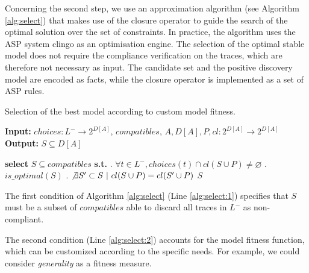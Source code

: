 Concerning the second step, we use an approximation algorithm (see Algorithm \ref{alg:select}) that makes use of the closure operator to guide the search of the optimal solution over the set of constraints. 
%
In practice, the algorithm uses the \ac{ASP} \cite{2008-Lifschitz} system clingo as an optimisation engine. The selection of the optimal stable model does not require the compliance verification on the traces, which are therefore not necessary as input. The candidate set and the positive discovery model are encoded as facts, while the closure operator is implemented as a set of \ac{ASP} rules.

\begin{algorithm}
    \caption{Selection of the best model according to custom model fitness.}
    \label{alg:select}
    \textbf{Input:}  ${choices} : L^- \rightarrow 2^{D[A]}$, ${compatibles}$, $A, D[A], P, {cl}: 2^{D[A]} \rightarrow 2^{D[A]}$\\
    \textbf{Output:} $S \subseteq D[A]$
	\begin{algorithmic}[1] 
	\State \textbf{select} $S \subseteq {compatibles}$ \textbf{s.t.} \label{alg:subsetC}
	\Indent
		. $\forall t \in L^-, {choices}(t) \cap {cl}(S \cup P) \neq \varnothing$ 	\label{alg:select:1}
		. $is\_optimal(S)$									\label{alg:select:2}
		. $\not\exists S' \subset S ~|~ {cl}(S \cup P) = {cl}(S' \cup P)$		\label{alg:select:3}
	\EndIndent
	\State \Return $S$
    \EndProcedure
    \end{algorithmic}
\end{algorithm}


The first condition of Algorithm \ref{alg:select} (Line \ref{alg:select:1}) specifies that $S$ must be a subset of ${compatibles}$ able to discard all traces in $L^-$ as non-compliant.

The second condition (Line \ref{alg:select:2}) accounts for the model fitness function, which can be customized according to the specific needs. For example, we could consider \emph{generality} as a fitness measure. 
%

